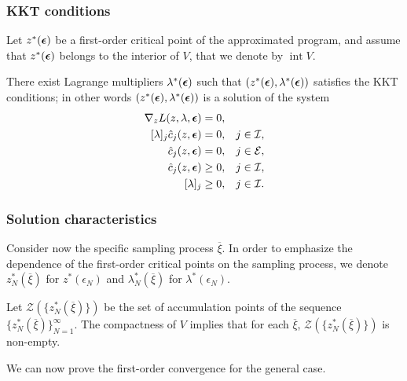 \documentclass[aspectratio=169]{beamer}
\begin{document}
\begin{frame}
\frametitle{KKT conditions}

Let $z^*({\boldsymbol{\epsilon}})$ be a first-order critical point of the approximated program, and assume that $z^*({\boldsymbol{\epsilon}})$ belongs to the interior of $V$, that we denote by $\operatorname{int} V$.

\mbox{}

There exist Lagrange multipliers $\lambda^*({\boldsymbol{\epsilon}})$ such that $(z^*({\boldsymbol{\epsilon}}), \lambda^*({\boldsymbol{\epsilon}}))$ satisfies the KKT conditions; in other words $(z^*({\boldsymbol{\epsilon}}), \lambda^*({\boldsymbol{\epsilon}}))$ is a solution of the system
\[
\begin{aligned}
\nabla_z L(z, \lambda, {\boldsymbol{\epsilon}}) &= 0, && \\
[\lambda]_j\hat{c}_j(z, {\boldsymbol{\epsilon}}) &= 0, && j \in \mathcal{I},\\
\hat{c}_j(z, {\boldsymbol{\epsilon}}) &= 0, && j \in \mathcal{E},\\
\hat{c}_j(z, {\boldsymbol{\epsilon}}) &\geq 0, && j \in \mathcal{I},\\
[\lambda]_j &\geq 0, && j \in \mathcal{I}.
\end{aligned}
\]

\end{frame}

\begin{frame}
\frametitle{Solution characteristics}

Consider now the specific sampling process $\overline{\xi}$.
In order to emphasize the dependence of the first-order critical points on the sampling process, we denote $z_N^*(\overline{\xi})$ for $z^*(\epsilon_N)$ and $\lambda_N^*(\overline{\xi})$ for $\lambda^*(\epsilon_N)$.

\mbox{}

Let $\mathcal{Z}\left(\lbrace z^*_N(\overline{\xi})\rbrace\right)$ be the set of accumulation points of the sequence $\lbrace z_N^*(\overline{\xi}) \rbrace_{N = 1}^{\infty}$.
The compactness of $V$ implies that for each $\overline{\xi}$, %
$\mathcal{Z}\left(\lbrace z^*_N(\overline{\xi})\rbrace\right)$ is non-empty.

\mbox{}

We can now prove the first-order convergence for the general case.

\end{frame}
\end{document}

